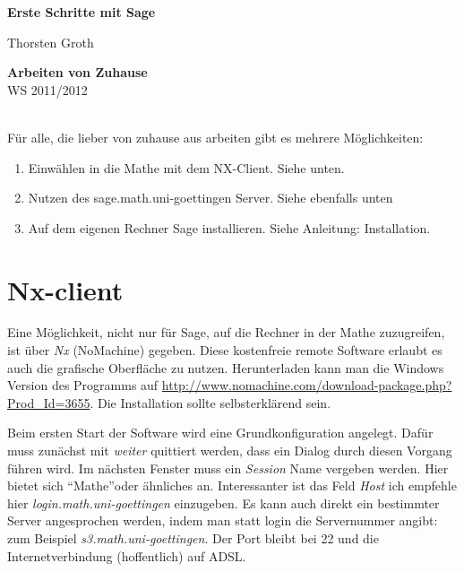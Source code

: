 \documentclass[a4paper,10pt,DIV15]{scrartcl}
\begin{document}

\begin{center}
\textbf{\LARGE Erste Schritte mit Sage}\\
\end{center}
\begin{minipage}{6cm}
Thorsten Groth
\end{minipage}\hfill
\begin{minipage}{2.5cm}
\begin{flushright}
\textbf{Arbeiten von Zuhause}\\
WS 2011/2012
\end{flushright}
\end{minipage}\\[1cm]


Für alle, die lieber von zuhause aus arbeiten gibt es mehrere Möglichkeiten:
\begin{enumerate}
 \item Einwählen in die Mathe mit dem NX-Client. Siehe unten.
 \item Nutzen des sage.math.uni-goettingen Server. Siehe ebenfalls unten
 \item Auf dem eigenen Rechner Sage installieren. Siehe Anleitung: Installation.
\end{enumerate}


\section{Nx-client}
Eine Möglichkeit, nicht nur für Sage, auf die Rechner in der Mathe zuzugreifen, ist über \emph{Nx} (NoMachine) gegeben. Diese kostenfreie 
remote Software erlaubt es auch die grafische Oberfläche zu nutzen. 
Herunterladen kann man die Windows Version des Programms auf 
\url{http://www.nomachine.com/download-package.php?Prod_Id=3655}. Die Installation
sollte selbsterklärend sein. 

Beim ersten Start der Software wird eine Grundkonfiguration angelegt. Dafür muss zunächst mit \emph{weiter} quittiert werden, dass ein Dialog
durch diesen Vorgang führen wird. 
Im nächsten Fenster muss ein \emph{Session} Name vergeben werden. Hier bietet sich \textquotedblleft Mathe\textquotedblright oder ähnliches an.
Interessanter ist das Feld \emph{Host} ich empfehle hier \emph{login.math.uni-goettingen} einzugeben. Es kann auch direkt ein bestimmter Server
angesprochen werden, indem man statt login die Servernummer angibt: zum Beispiel \emph{s3.math.uni-goettingen}.
Der Port bleibt bei 22 und die Internetverbindung (hoffentlich) auf ADSL. 
\end{document}
